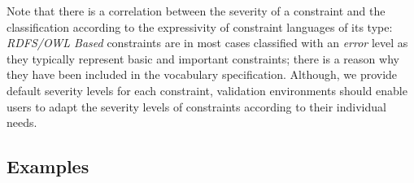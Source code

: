 \documentclass[conference]{IEEEtran}
\newcommand{\tb}[1]{\todo[size=\small, color=green!40]{\textbf{Thomas:} #1}}
\begin{document}
Note that there is a correlation between the severity of a constraint and the classification according to the expressivity of constraint languages of its type: \emph{RDFS/OWL Based} constraints are in most cases classified with an \emph{error} level as they typically represent basic and important constraints; there is a reason why they have been included in the vocabulary specification. Although, we provide default severity levels for each constraint, validation environments should enable users to adapt the severity levels of constraints according to their individual needs.

%
%
%

%


\subsection{Examples}
\label{vocabulary-constraint-types}
\end{document}
